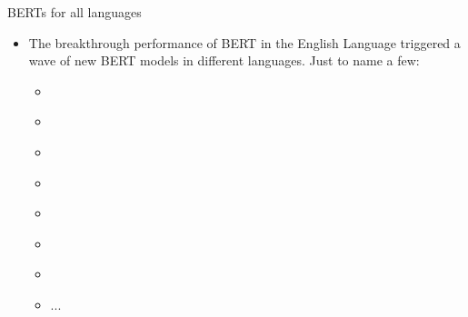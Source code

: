 \begin{frame}{BERTs for all languages}

\vfill

\begin{itemize}
	\item The breakthrough performance of BERT in the English Language triggered a wave of new
				BERT models in different languages. Just to name a few:
			\begin{itemize}
				\item \href{https://huggingface.co/bert-base-german-cased}{}
				\item \href{https://huggingface.co/flaubert/flaubert_base_cased}{}
				\item \href{https://huggingface.co/dccuchile/bert-base-spanish-wwm-cased}{}
				\item \href{https://huggingface.co/GroNLP/bert-base-dutch-cased}{}
				\item \href{https://huggingface.co/bert-base-chinese}{}
				\item \href{https://huggingface.co/DeepPavlov/rubert-base-cased}{}
				\item \href{https://huggingface.co/dbmdz/bert-base-italian-cased}{}
				\item ...
			\end{itemize}
\end{itemize}
	
\vfill

\end{frame}


